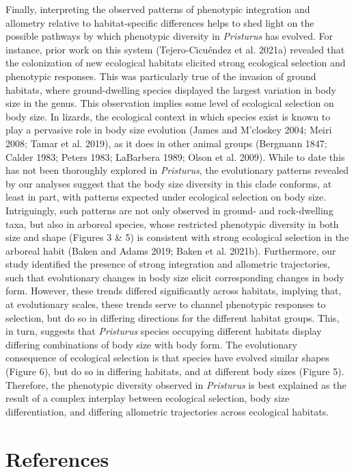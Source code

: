 \documentclass[
  11pt,
]{article}
\begin{document}
Finally, interpreting the observed patterns of phenotypic integration
and allometry relative to habitat-specific differences helps to shed
light on the possible pathways by which phenotypic diversity in
\emph{Pristurus} has evolved. For instance, prior work on this system
(Tejero-Cicuéndez et al. 2021a) revealed that the colonization of new
ecological habitats elicited strong ecological selection and phenotypic
responses. This was particularly true of the invasion of ground
habitats, where ground-dwelling species displayed the largest variation
in body size in the genus. This observation implies some level of
ecological selection on body size. In lizards, the ecological context in
which species exist is known to play a pervasive role in body size
evolution (James and M'closkey 2004; Meiri 2008; Tamar et al. 2019), as
it does in other animal groups (Bergmann 1847; Calder 1983; Peters 1983;
LaBarbera 1989; Olson et al. 2009). While to date this has not been
thoroughly explored in \emph{Pristurus}, the evolutionary patterns
revealed by our analyses suggest that the body size diversity in this
clade conforms, at least in part, with patterns expected under
ecological selection on body size. Intriguingly, such patterns are not
only observed in ground- and rock-dwelling taxa, but also in arboreal
species, whose restricted phenotypic diversity in both size and shape
(Figures 3 \& 5) is consistent with strong ecological selection in the
arboreal habit (Baken and Adams 2019; Baken et al. 2021b). Furthermore,
our study identified the presence of strong integration and allometric
trajectories, such that evolutionary changes in body size elicit
corresponding changes in body form. However, these trends differed
significantly across habitats, implying that, at evolutionary scales,
these trends serve to channel phenotypic responses to selection, but do
so in differing directions for the different habitat groups. This, in
turn, suggests that \emph{Pristurus} species occupying different
habitats display differing combinations of body size with body form. The
evolutionary consequence of ecological selection is that species have
evolved similar shapes (Figure 6), but do so in differing habitats, and
at different body sizes (Figure 5). Therefore, the phenotypic diversity
observed in \emph{Pristurus} is best explained as the result of a
complex interplay between ecological selection, body size
differentiation, and differing allometric trajectories across ecological
habitats.

\newpage

\hypertarget{references}{%
\section*{References}\label{references}}
\end{document}
